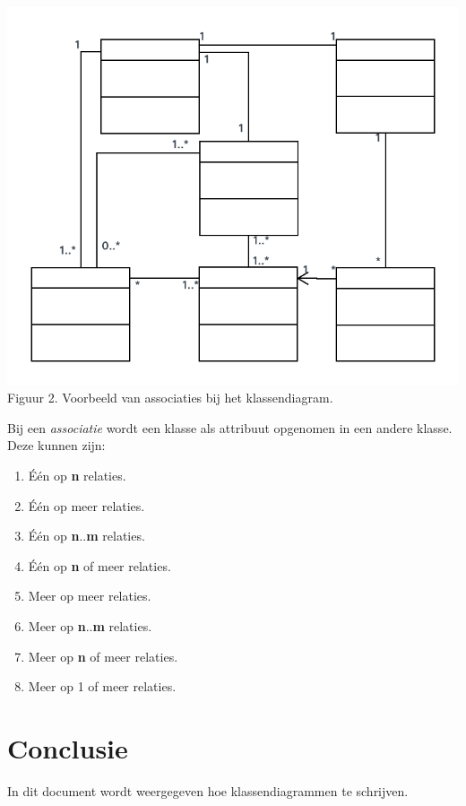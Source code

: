 \documentclass{article}
\begin{document}
	\includegraphics[scale=1]{assoc.png} \\
	Figuur 2. Voorbeeld van associaties bij het klassendiagram.
	
	Bij een \textit{associatie} wordt een klasse als attribuut opgenomen in een andere klasse. \\
	
	Deze kunnen zijn: \\
	
	\begin{enumerate}
		\item \'{E}\'{e}n op \textbf{n} relaties.
		\item \'{E}\'{e}n op meer relaties.
		\item \'{E}\'{e}n op \textbf{n}..\textbf{m} relaties.
		\item \'{E}\'{e}n op \textbf{n} of meer relaties.
		\item Meer op meer relaties.
		\item Meer op \textbf{n}..\textbf{m} relaties.
		\item Meer op \textbf{n} of meer relaties.
		\item Meer op 1 of meer relaties.
	\end{enumerate}
	
	\section{Conclusie}
	
	In dit document wordt weergegeven hoe klassendiagrammen te schrijven.
	
\end{document}
